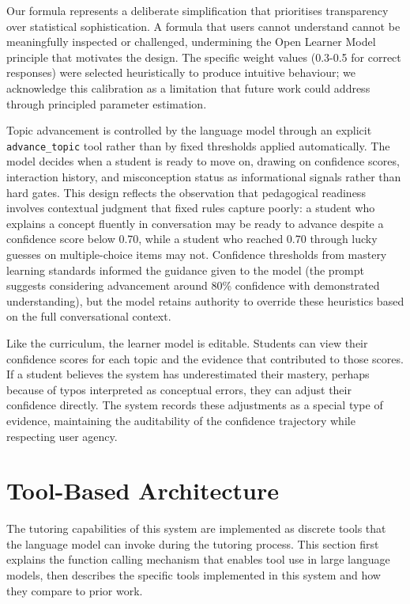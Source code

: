 \documentclass[logo,bsc,singlespacing,parskip,online]{infthesis}
\begin{document}
Our formula represents a deliberate simplification that prioritises transparency over statistical sophistication. A formula that users cannot understand cannot be meaningfully inspected or challenged, undermining the Open Learner Model principle that motivates the design. The specific weight values (0.3-0.5 for correct responses) were selected heuristically to produce intuitive behaviour; we acknowledge this calibration as a limitation that future work could address through principled parameter estimation.

Topic advancement is controlled by the language model through an explicit \texttt{advance\_topic} tool rather than by fixed thresholds applied automatically. The model decides when a student is ready to move on, drawing on confidence scores, interaction history, and misconception status as informational signals rather than hard gates. This design reflects the observation that pedagogical readiness involves contextual judgment that fixed rules capture poorly: a student who explains a concept fluently in conversation may be ready to advance despite a confidence score below 0.70, while a student who reached 0.70 through lucky guesses on multiple-choice items may not. Confidence thresholds from mastery learning standards \citep{guskey2007mastery, kulik2016itsmeta} informed the guidance given to the model (the prompt suggests considering advancement around 80\% confidence with demonstrated understanding), but the model retains authority to override these heuristics based on the full conversational context.

Like the curriculum, the learner model is editable. Students can view their confidence scores for each topic and the evidence that contributed to those scores. If a student believes the system has underestimated their mastery, perhaps because of typos interpreted as conceptual errors, they can adjust their confidence directly. The system records these adjustments as a special type of evidence, maintaining the auditability of the confidence trajectory while respecting user agency.

\section{Tool-Based Architecture}

The tutoring capabilities of this system are implemented as discrete tools that the language model can invoke during the tutoring process. This section first explains the function calling mechanism that enables tool use in large language models, then describes the specific tools implemented in this system and how they compare to prior work.
\end{document}
